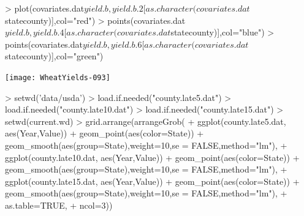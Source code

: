 \documentclass{report}
\begin{document}
\begin{Schunk}
\begin{Sinput}
> plot(covariates.dat$yield.b,yield.b.2[as.character(covariates.dat$statecounty)],col="red")
> points(covariates.dat$yield.b,yield.b.4[as.character(covariates.dat$statecounty)],col="blue")
> points(covariates.dat$yield.b,yield.b.6[as.character(covariates.dat$statecounty)],col="green")
\end{Sinput}
\end{Schunk}
\texttt{[image: WheatYields-093]}







\begin{Schunk}
\begin{Sinput}
> setwd('data/usda')
> load.if.needed("county.late5.dat")
> load.if.needed("county.late10.dat")
> load.if.needed("county.late15.dat")
> setwd(current.wd)
> grid.arrange(arrangeGrob(
+   ggplot(county.late5.dat, aes(Year,Value)) + geom_point(aes(color=State)) + geom_smooth(aes(group=State),weight=10,se = FALSE,method="lm"),
+   ggplot(county.late10.dat, aes(Year,Value)) + geom_point(aes(color=State)) + geom_smooth(aes(group=State),weight=10,se = FALSE,method="lm"),
+   ggplot(county.late15.dat, aes(Year,Value)) + geom_point(aes(color=State)) + geom_smooth(aes(group=State),weight=10,se = FALSE,method="lm"),
+    as.table=TRUE,
+    ncol=3))
\end{Sinput}
\end{Schunk}
\end{document}
